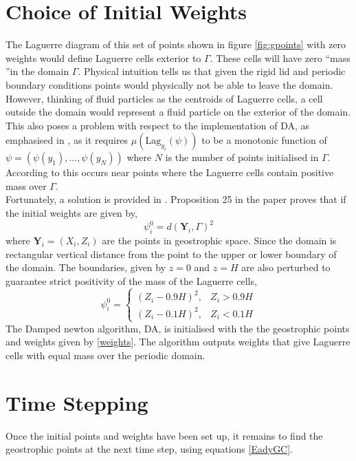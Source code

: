 \section{Choice of Initial Weights \label{Initweights}}
The Laguerre diagram of this set of points shown in figure \ref{fig:gpoints} with zero weights would define Laguerre cells exterior to $\Gamma$. These cells will have zero \textquotedblleft mass \textquotedblright in the domain $\Gamma$. Physical intuition tells us that given the rigid lid and periodic boundary conditions points would physically not be able to leave the domain. However, thinking of fluid particles as the centroids of Laguerre cells, a cell outside the domain would represent a fluid particle on the exterior of the domain. This also poses a problem with respect to the implementation of DA, as emphasised in \cite{Merigot2017}, as it requires $\mu\left(\text{Lag}_{y_i}(\psi)\right)$ to be a monotonic function of $\psi = (\psi(y_1),...,\psi(y_N))$ where $N$ is the number of points initialised in $\Gamma$. According to \cite{Merigot2017} this occurs near points where the Laguerre cells contain positive mass over $\Gamma$.\\
\linebreak
Fortunately, a solution is provided in \cite{Merigot2017}. Proposition 25 in the paper proves that if the initial weights are given by,
\begin{equation*}
	\psi_i^0 = d\left(\bm{Y}_i,\Gamma\right)^2
\end{equation*}
where $\bm{Y}_i = \left(X_i,Z_i\right)$ are the points in geostrophic space. Since the domain is rectangular vertical distance from the point to the upper or lower boundary of the domain. The boundaries, given by $z=0$ and $z = H$ are also perturbed to guarantee strict positivity of the mass of the Laguerre cells, 
\begin{equation}
\psi_i^0 = \begin{cases}
\left(Z_i - 0.9H\right)^2, & Z_i > 0.9H \\
\left(Z_i - 0.1H\right)^2, & Z_i < 0.1H
\end{cases}
\label{weights}
\end{equation}
The Damped newton algorithm, DA, is initialised with the the geostrophic points and weights given by \ref{weights}. The algorithm outputs weights that give Laguerre cells with equal mass over the periodic domain.
\section{Time Stepping \label{timestep}}
Once the initial points and weights have been set up, it remains to find the geostrophic points at the next time step, using equations \ref{EadyGC}.
